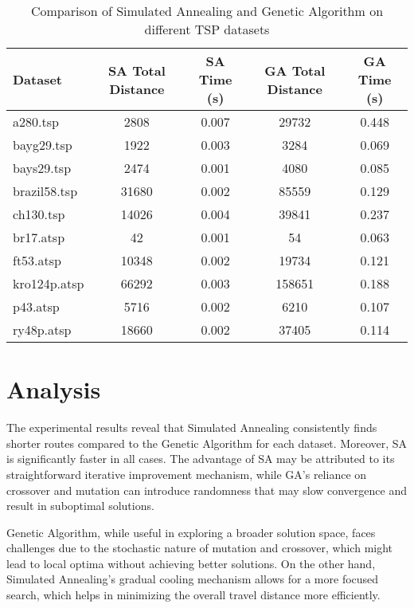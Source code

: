 \documentclass{article}
\begin{document}
\begin{table}[h!]
    \centering
    \begin{tabular}{lcccc}
        \toprule
        \textbf{Dataset} & \textbf{SA Total Distance} & \textbf{SA Time (s)} & \textbf{GA Total Distance} & \textbf{GA Time (s)} \\
        \midrule
        a280.tsp & 2808 & 0.007 & 29732 & 0.448 \\
        bayg29.tsp & 1922 & 0.003 & 3284 & 0.069 \\
        bays29.tsp & 2474 & 0.001 & 4080 & 0.085 \\
        brazil58.tsp & 31680 & 0.002 & 85559 & 0.129 \\
        ch130.tsp & 14026 & 0.004 & 39841 & 0.237 \\
        br17.atsp & 42 & 0.001 & 54 & 0.063 \\
        ft53.atsp & 10348 & 0.002 & 19734 & 0.121 \\
        kro124p.atsp & 66292 & 0.003 & 158651 & 0.188 \\
        p43.atsp & 5716 & 0.002 & 6210 & 0.107 \\
        ry48p.atsp & 18660 & 0.002 & 37405 & 0.114 \\
        \bottomrule
    \end{tabular}
    \caption{Comparison of Simulated Annealing and Genetic Algorithm on different TSP datasets}
    \label{tab:results}
\end{table}

\section{Analysis}
The experimental results reveal that Simulated Annealing consistently finds shorter routes compared to the Genetic Algorithm for each dataset. Moreover, SA is significantly faster in all cases. The advantage of SA may be attributed to its straightforward iterative improvement mechanism, while GA's reliance on crossover and mutation can introduce randomness that may slow convergence and result in suboptimal solutions.

Genetic Algorithm, while useful in exploring a broader solution space, faces challenges due to the stochastic nature of mutation and crossover, which might lead to local optima without achieving better solutions. On the other hand, Simulated Annealing's gradual cooling mechanism allows for a more focused search, which helps in minimizing the overall travel distance more efficiently.
\end{document}
